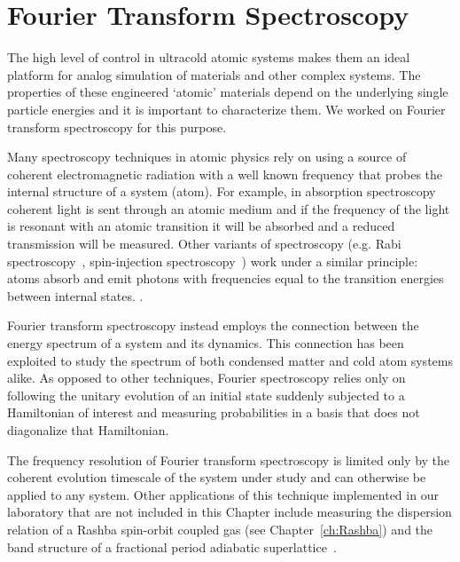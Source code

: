 

\renewcommand{\thechapter}{5}

\chapter{Fourier Transform Spectroscopy}
\label{ch:Fourier_spectroscopy}


The high level of control in ultracold atomic systems makes them an ideal platform for analog simulation of materials and other complex systems. The properties of these engineered `atomic' materials depend on the underlying single particle energies and it is important to characterize them. We worked on Fourier transform spectroscopy for this purpose. 

Many spectroscopy techniques in atomic physics rely on using 
a source of coherent electromagnetic radiation with a well known frequency that probes the internal structure of a system (atom). For example, in absorption spectroscopy~\cite{demtroder_doppler-limited_2008} coherent light is sent through an atomic medium and if the frequency of the light is resonant with an atomic transition it will be absorbed and a reduced transmission will be measured. Other variants of spectroscopy (e.g. Rabi spectroscopy~\cite{rabi_space_1937}, spin-injection spectroscopy~\cite{cheuk_spin-injection_2012}) work under a similar principle: atoms absorb and emit photons with frequencies equal to the transition energies between internal states. .

Fourier transform spectroscopy instead employs the connection between the energy spectrum of a system and its dynamics. This connection has been exploited to study the spectrum of both condensed matter \cite{jonas_two-dimensional_2003} and cold atom systems \cite{yoshimura_diabatic-ramping_2014,wang_atom-interferometric_2015} alike.
As opposed to other techniques, Fourier spectroscopy relies only on following the unitary evolution of an initial state suddenly subjected to a Hamiltonian of interest and measuring probabilities in a basis that does not diagonalize that Hamiltonian. 

The frequency resolution of Fourier transform spectroscopy is limited only by the coherent evolution timescale of the system under study and can otherwise be applied to any system. Other applications of this technique implemented in our laboratory that are not included in this Chapter include measuring the dispersion relation of a Rashba spin-orbit coupled gas (see Chapter~\ref{ch:Rashba}) and the band structure of a fractional period adiabatic superlattice~\cite{anderson_realization_2019}.

